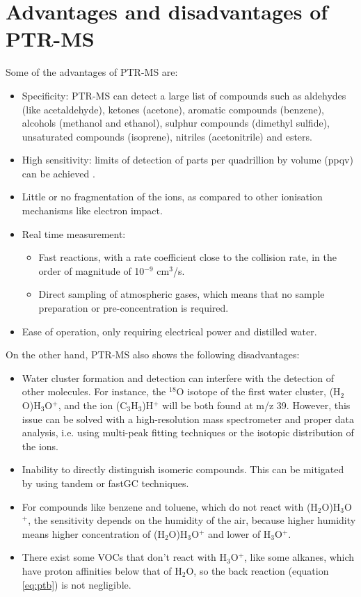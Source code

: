 \section{Advantages and disadvantages of PTR-MS}
Some of the advantages of PTR-MS are:
\begin{itemize}
\item Specificity: PTR-MS can detect a large list of compounds such as aldehydes (like acetaldehyde), ketones (acetone), aromatic compounds (benzene), alcohols (methanol and ethanol), sulphur compounds (dimethyl sulfide), unsaturated compounds (isoprene), nitriles (acetonitrile) and esters. 
\item High sensitivity: limits of detection of parts per quadrillion by volume (ppqv) can be achieved \cite{ioniconlod}.
\item Little or no fragmentation of the ions, as compared to other ionisation mechanisms like electron impact.
\item Real time measurement:
\begin{itemize}
\item Fast reactions, with a rate coefficient close to the collision rate, in the order of magnitude of 10$^{-9}$ cm$^{3}$/s.
\item Direct sampling of atmospheric gases, which means that no sample preparation or pre-concentration is required.
\end{itemize}
\item Ease of operation, only requiring electrical power and distilled water.
\end{itemize}

On the other hand, PTR-MS also shows the following disadvantages:
\begin{itemize}
\item Water cluster formation and detection can interfere with the detection of other molecules. For instance, the $^{18}$O isotope of the first water cluster, (H$_2$O)H$_3$O$^+$, and the ion (C$_3$H$_3$)H$^+$ will  be both found at m/z 39. However, this issue can be solved with a high-resolution mass spectrometer and proper data analysis, i.e. using multi-peak fitting techniques or the isotopic distribution of the ions.
\item Inability to directly distinguish isomeric compounds. This can be mitigated by using tandem or fastGC techniques.
\item For compounds like benzene and toluene, which do not react with (H$_2$O)H$_3$O$^+$, the sensitivity depends on the humidity of the air, because higher humidity means higher concentration of (H$_2$O)H$_3$O$^+$ and lower of H$_3$O$^+$.
\item There exist some VOCs that don’t react with H$_3$O$^+$, like some alkanes, which have proton affinities below that of H$_2$O, so the back reaction (equation \ref{eq:ptb}) is not negligible.
\end{itemize}


